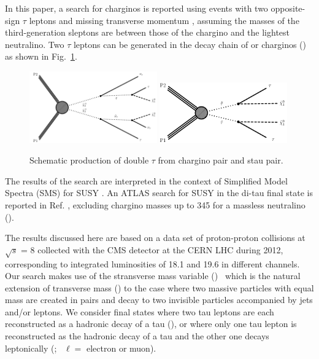 In this paper, a search for charginos is reported using events 
with two opposite-sign $\tau$ leptons and 
missing transverse momentum %
, assuming the masses of the third-generation sleptons are between those of the 
chargino and the lightest neutralino. 
Two $\tau$ leptons can be generated in the decay chain of \sTau 
or charginos (\PSGcpDo) as shown in Fig.~\ref{fig:Productions}. 
\begin{figure}[!htb]
\centering
\includegraphics[width=0.49\textwidth]{Introductionfigs/TChipmSlepSnu.pdf}
\includegraphics[width=0.49\textwidth]{Introductionfigs/TSlepSlep.pdf}
\caption{Schematic production of double $\tau$ from chargino pair and stau pair.}
\label{fig:Productions}
\end{figure}
The results of the search are interpreted in the context of Simplified Model Spectra (SMS) for SUSY \cite{Alwall:2008ag,alves:sms}.
An ATLAS search for SUSY in the di-tau final state is reported in Ref. \cite{Aad:2014yka}, excluding chargino masses up to 345 \GeV 
for a massless neutralino (\PSGczDo).

The results discussed here are based on a data set of proton-proton 
collisions at $\sqrt{s}$ = 8\TeV
collected with the CMS detector at the CERN LHC during 2012, corresponding to integrated
luminosities of 18.1 and 19.6 \invfb in different channels. 
Our search makes use of the stransverse mass variable (\mttwo)~\cite{Lester:1999tx,Barr:2003rg}
which is the natural extension of transverse mass (\mt) to the case 
where two massive particles with equal mass are created in pairs and decay 
to two invisible particles accompanied by jets and/or leptons.  We consider final states where
two tau leptons are each reconstructed as a hadronic decay of a tau (\tauTau), or where only one tau lepton is reconstructed as the hadronic 
decay of a tau and the other one decays leptonically (\leptonTau;~ $\ell=$ electron or muon).

